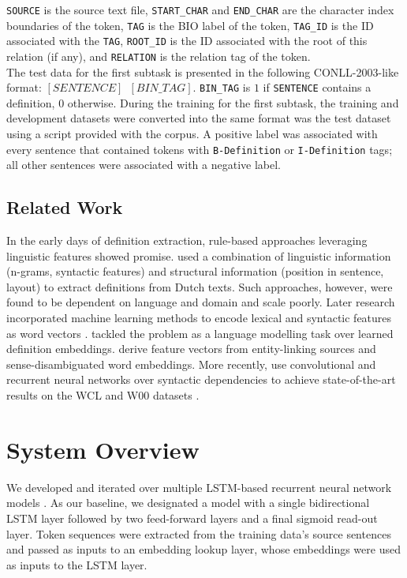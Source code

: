 \documentclass[11pt]{article}
\begin{document}
{\small\texttt{SOURCE}} is the source text file, {\small\texttt{START\_CHAR}} and {\small\texttt{END\_CHAR}} are the character index
boundaries of the token, {\small\texttt{TAG}} is the BIO label of the token, {\small\texttt{TAG\_ID}} is the ID
associated with the {\small\texttt{TAG}}, {\small\texttt{ROOT\_ID}} is the ID associated with the root of this relation
(if any), and {\small\texttt{RELATION}} is the relation tag of the token.\\

The test data for the first subtask is presented in the following CONLL-2003-like format:
{\small\texttt{$[SENTENCE]\hspace{6pt}[BIN\_TAG]$}}. {\small\texttt{BIN\_TAG}} is $1$ if
{\small\texttt{SENTENCE}} contains a definition, $0$ otherwise. During the training for the first subtask, the training and
development datasets were converted into the same format was the test dataset using a script provided with the corpus. A positive
label was associated with every sentence that contained tokens with {\small\texttt{B-Definition}} or {\small\texttt{I-Definition}} tags;
all other sentences were associated with a negative label.


\subsection{Related Work}
In the early days of definition extraction, rule-based approaches leveraging  linguistic features showed promise.
 used a combination of linguistic information (n-grams, syntactic features) and
structural information (position in sentence, layout) to extract definitions from Dutch texts. Such approaches, however,
were found to be dependent on language and domain and scale poorly. Later research incorporated machine learning
methods to encode lexical and syntactic features as word vectors \cite{del2014coping}. 
tackled the problem as a language modelling task over learned definition embeddings. 
derive feature vectors from entity-linking sources and sense-disambiguated word embeddings. More recently,
 use convolutional and recurrent neural networks over syntactic dependencies to achieve
state-of-the-art results on the WCL and W00 datasets \cite{navigli2010learning,jin2013mining}.


\section{System Overview}
We developed and iterated over multiple LSTM-based recurrent neural network models \cite{hochreiter1997long}. As our baseline,
we designated a model with a single bidirectional LSTM layer followed by two feed-forward layers and a final sigmoid read-out layer.
Token sequences were extracted from the training data's source sentences and passed as inputs to an embedding lookup layer, whose
embeddings were used as inputs to the LSTM layer.\\
\end{document}
